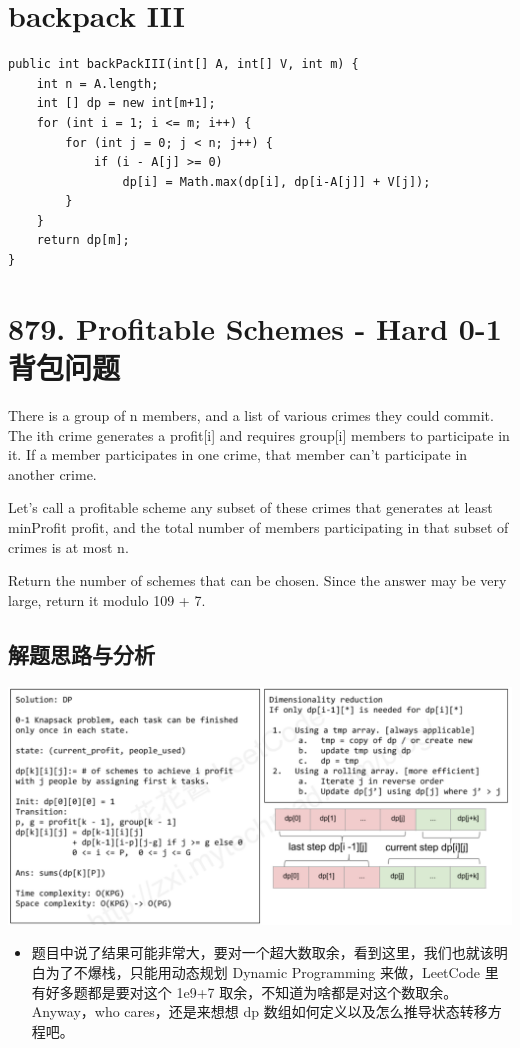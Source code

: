 \documentclass[9pt, b5paaper]{book}
\begin{document}
\section{backpack III}
\label{sec-2-25}
\begin{verbatim}
public int backPackIII(int[] A, int[] V, int m) {
    int n = A.length;
    int [] dp = new int[m+1];
    for (int i = 1; i <= m; i++) {
        for (int j = 0; j < n; j++) {
            if (i - A[j] >= 0)
                dp[i] = Math.max(dp[i], dp[i-A[j]] + V[j]);
        }
    }
    return dp[m];
}
\end{verbatim}

\section{879. Profitable Schemes - Hard 0-1背包问题}
\label{sec-2-26}
There is a group of n members, and a list of various crimes they could commit. The ith crime generates a profit[i] and requires group[i] members to participate in it. If a member participates in one crime, that member can't participate in another crime.

Let's call a profitable scheme any subset of these crimes that generates at least minProfit profit, and the total number of members participating in that subset of crimes is at most n.

Return the number of schemes that can be chosen. Since the answer may be very large, return it modulo 109 + 7.
\subsection{解题思路与分析}
\label{sec-2-26-1}

\includegraphics[width=.9\linewidth]{./pic/crime.png}

\begin{itemize}
\item 题目中说了结果可能非常大，要对一个超大数取余，看到这里，我们也就该明白为了不爆栈，只能用动态规划 Dynamic Programming 来做，LeetCode 里有好多题都是要对这个 1e9+7 取余，不知道为啥都是对这个数取余。Anyway，who cares，还是来想想 dp 数组如何定义以及怎么推导状态转移方程吧。
\end{itemize}
\end{document}
